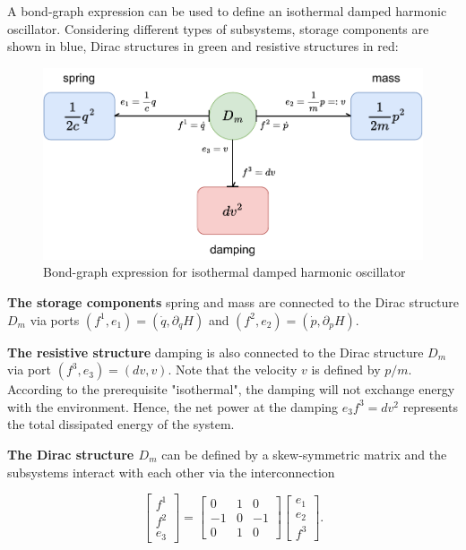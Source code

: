 \documentclass[
	parskip, 			   %
	twoside, 			   %
	DIV=14, 			   %
	BCOR=15.0mm, 		   %
	headsepline, 		   %
	open=right, 		   %
	captions=tableheading, %
	bibliography=totoc,    %
	numbers=noenddot       %
]{scrreprt}
\begin{document}
A bond-graph expression can be used to define an isothermal damped harmonic oscillator. Considering different types of subsystems, storage components are shown in blue, Dirac structures in green and resistive structures in red:

\begin{figure}[h!]
    \centering
    \includegraphics[scale=1]{figures/bondgraph_idho.pdf}
    \caption{Bond-graph expression for isothermal damped harmonic oscillator}
    \label{fig:bondgraph_idho}
\end{figure}

\textbf{The storage components} spring and mass are connected to the Dirac structure $D_m$ via ports 
$(f^1, e_1) = (\dot{q}, \partial_q H)$ and $(f^2, e_2) = (\dot{p}, \partial_p H)$.

\textbf{The resistive structure} damping is also connected to the Dirac structure $D_m$ via port $(f^3, e_3) = (dv, v)$. Note that the velocity $v$ is defined by $p/m$. According to the prerequisite "isothermal", the damping will not exchange energy with the environment. Hence, the net power at the damping $e_3 f^3 = dv^2$ represents the total dissipated energy of the system.

\textbf{The Dirac structure $D_m$} can be defined by a skew-symmetric matrix and the subsystems interact with each other via the interconnection

\begin{equation}
    \label{eq:interconnection_idho}
    \left[\begin{array}{c}
    f^1 \\
    f^2 \\
    \hline e_{3}
    \end{array}\right]=\left[\begin{array}{rr|r}
    0 & 1 & 0 \\
    -1 & 0 & -1 \\
    \hline 0 & 1 & 0
    \end{array}\right]\left[\begin{array}{c}
    e_1 \\
    e_2 \\
    \hline f^{3}
    \end{array}\right].
\end{equation}
\end{document}
